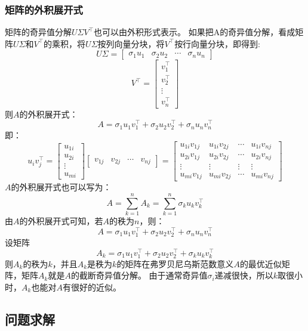 \documentclass{article}
\begin{document}
\subsubsection{矩阵的外积展开式}
矩阵的奇异值分解$U\Sigma V^\intercal$也可以由外积形式表示。
如果把A的奇异值分解，看成矩阵$U\Sigma$和$V^\intercal$的乘积，将$U\Sigma$按列向量分块，将$V^\intercal$按行向量分块，即得到:
$$
U\Sigma = \left[\begin{matrix} \sigma_1u_1 & \sigma_2u_2 & \cdots & \sigma_nu_n \end{matrix}\right]
$$
$$
V^\intercal = \left[\begin{matrix}v_1^\intercal \\ v_2^\intercal \\ \vdots \\ v_n^\intercal\end{matrix}\right]
$$
则$A$的外积展开式：
$$
A = \sigma_1u_1v_1^\intercal+\sigma_2u_2v_2^\intercal+\sigma_n u_n v_n^\intercal
$$
即：
$$
u_iv_j^\intercal = \left[\begin{matrix}u_{1i} \\ u_{2i} \\ \vdots \\ u_{mi}\end{matrix}\right] \left[\begin{matrix} v_{1j} & v_{2j} & \cdots & v_{nj} \end{matrix}\right]
 = \left[\begin{matrix}u_{1i}v_{1j} & u_{1i}v_{2j} & \cdots & u_{1i}v_{nj}\\u_{2i}v_{1j} & u_{2i}v_{2j} & \cdots & u_{2i}v_{nj}\\\vdots&\vdots&\vdots&\vdots\\u_{mi}v_{1j} & u_{mi}v_{2j} & \cdots & u_{mi}v_{nj}\end{matrix}\right]
$$
$A$的外积展开式也可以写为：
$$
A = \sum_{k=1}^n A_k = \sum_{k=1}^n \sigma_k u_k v_k^\intercal
$$
由$A$的外积展开式可知，若$A$的秩为$n$，则：
$$
A = \sigma_1u_1v_1^\intercal+\sigma_2u_2v_2^\intercal+\sigma_nu_nv_n^\intercal
$$
设矩阵
$$
A_k = \sigma_1u_1v_1^\intercal+\sigma_2u_2v_2^\intercal+\sigma_k u_k v_k^\intercal
$$
则$A_k$的秩为$k$，并且$A_k$是秩为$k$的矩阵在弗罗贝尼乌斯范数意义$A$的最优近似矩阵，矩阵$A_k$就是$A$的截断奇异值分解。
由于通常奇异值$\sigma_i$递减很快，所以$k$取很小时，$A_k$也能对$A$有很好的近似。

\subsection{问题求解}
\end{document}

